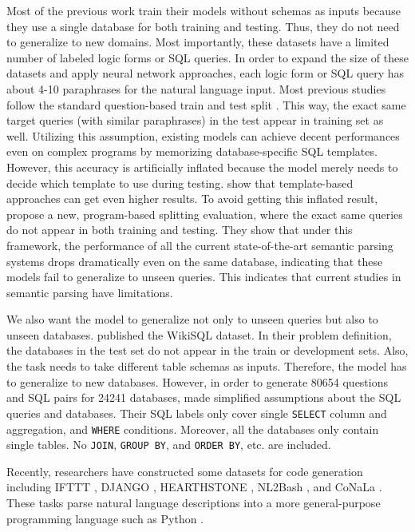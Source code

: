 \documentclass[11pt,a4paper]{article}
\begin{document}
Most of the previous work train their models without schemas as inputs because they use a single database for both training and testing. Thus, they do not need to generalize to new domains. Most importantly, these datasets have a limited number of labeled logic forms or SQL queries. In order to expand the size of these datasets and apply neural network approaches, each logic form or SQL query has about 4-10 paraphrases for the natural language input. Most previous studies follow the standard question-based train and test split \cite{Zettlemoyer05}. This way, the exact same target queries (with similar paraphrases) in the test appear in training set as well. Utilizing this assumption, existing models can achieve decent performances even on complex programs by memorizing database-specific SQL templates. However, this accuracy is artificially inflated because the model merely needs to decide which template to use during testing. \citet{cathy18} show that template-based approaches can get even higher results. To avoid getting this inflated result, \citet{cathy18} propose a new, program-based splitting evaluation, where the exact same queries do not appear in both training and testing. They show that under this framework, the performance of all the current state-of-the-art semantic parsing systems drops dramatically even on the same database, indicating that these models fail to generalize to unseen queries. This indicates that current studies in semantic parsing have limitations.

We also want the model to generalize not only to unseen queries but also to unseen databases.
\citet{Zhong2017} published the WikiSQL dataset. In their problem definition, the databases in the test set do not appear in the train or development sets. Also, the task needs to take different table schemas as inputs. Therefore, the model has to generalize to new databases.
However, in order to generate 80654 questions and SQL pairs for 24241 databases, \citet{Zhong2017} made simplified assumptions about the SQL queries and databases. Their SQL labels only cover single \texttt{SELECT} column and aggregation, and \texttt{WHERE} conditions. Moreover, all the databases only contain single tables. No \texttt{JOIN}, \texttt{GROUP BY}, and \texttt{ORDER BY}, etc. are included.


Recently, researchers have constructed some datasets for code generation including IFTTT \cite{quirk2015language}, DJANGO \cite{Oda15}, HEARTHSTONE \cite{ling16}, NL2Bash \cite{nl2bash}, and CoNaLa \cite{yin18msr}. These tasks parse natural language descriptions into a more general-purpose programming language such as Python \cite{Allamanis15,ling16, RabinovichSK17,Yin17}.
\end{document}
